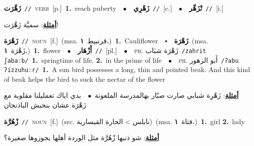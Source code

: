 \documentclass[10pt,a4paper,twoside]{article} %
\begin{document}
\begin{multicols}{2}
{\setlength\topsep{0pt}\textbf{\foreignlanguage{arabic}{زَهَّرَت}}\ {\color{gray}\texttt{//}\color{black}}\ \textsc{verb}\ [p.]\ \textbf{1.}~reach puberty\ \ $\bullet$\ \ \setlength\topsep{0pt}\textbf{\foreignlanguage{arabic}{زَهْرِي}}\ {\color{gray}\texttt{//}\color{black}}\ [c.]\ \ $\bullet$\ \ \setlength\topsep{0pt}\textbf{\foreignlanguage{arabic}{تْزَهِّر}}\ {\color{gray}\texttt{//}\color{black}}\ [i.]\  \begin{flushright}\color{gray}\foreignlanguage{arabic}{\textbf{\underline{\foreignlanguage{arabic}{أمثلة}}}: سميَّة زَهَّرَت!}\end{flushright}\color{black}} \vspace{2mm}

{\setlength\topsep{0pt}\textbf{\foreignlanguage{arabic}{زَهْرَة}}\ {\color{gray}\texttt{//}\color{black}}\ \textsc{noun}\ [f.]\ \color{gray}(msa. \foreignlanguage{arabic}{قرنبيط}~\foreignlanguage{arabic}{\textbf{١.}})\color{black}\ \textbf{1.}~Cauliflower\ \ $\smblkdiamond$\ \ \setlength\topsep{0pt}\textbf{\foreignlanguage{arabic}{زَهْرَة}}\ \color{gray}(msa. \foreignlanguage{arabic}{زَهْرَة}~\foreignlanguage{arabic}{\textbf{١.}})\color{black}\ \textbf{1.}~flower\ \ $\bullet$\ \ \setlength\topsep{0pt}\textbf{\foreignlanguage{arabic}{أَزْهَار}}\ {\color{gray}\texttt{//}\color{black}}\ [pl.]\ \ $\bullet$\ \ \textsc{ph.} \color{gray} \foreignlanguage{arabic}{زَهْرَة شبَاب}\color{black}\ {\color{gray}\texttt{/{\sffamily zahrit ʃabaːb}/}\color{black}}\ \textbf{1.}~springtime of life.  \textbf{2.}~in the prime of life\ \ $\bullet$\ \ \textsc{ph.} \color{gray} \foreignlanguage{arabic}{أَبو الزهور}\color{black}\ {\color{gray}\texttt{/{\sffamily ʔabu ʔizzuhuːr}/}\color{black}}\ \textbf{1.}~A sun bird possesses a long, thin and pointed beak. And this kind of beak helps the bird to suck the nectar of the flower\  \begin{flushright}\color{gray}\foreignlanguage{arabic}{\textbf{\underline{\foreignlanguage{arabic}{أمثلة}}}: زَهْرِة شبابي صارت صبّار بهالمدرسة الملعونة\ $\bullet$\ \  بدي اياك تعمليلنا مقلوبة مع زَهْرَة عشان بنحبش الباذنجان}\end{flushright}\color{black}} \vspace{2mm}

{\setlength\topsep{0pt}\textbf{\foreignlanguage{arabic}{زْهُرَّة}}\ {\color{gray}\texttt{//}\color{black}}\ \textsc{noun}\ [f.]\ (src. \color{gray}\foreignlanguage{arabic}{نابلس > الحارة القيسارية}\color{black})\ \color{gray}(msa. \foreignlanguage{arabic}{فتاة}~\foreignlanguage{arabic}{\textbf{١.}})\color{black}\ \textbf{1.}~girl  \textbf{2.}~lady\  \begin{flushright}\color{gray}\foreignlanguage{arabic}{\textbf{\underline{\foreignlanguage{arabic}{أمثلة}}}: شو ذنبها زْهُرَّة مثل الوردة أهلها يجوزوها صغيرة؟}\end{flushright}\color{black}} \vspace{2mm}


\end{multicols}
\end{document}
